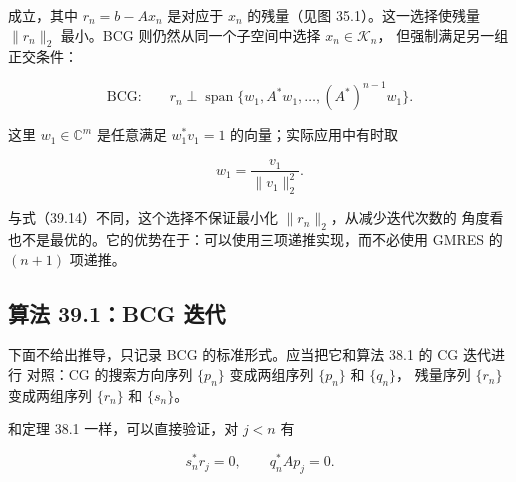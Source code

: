 \documentclass[UTF8,fontset=none,12pt]{ctexart}
\begin{document}
成立，其中 $r_n=b-Ax_n$ 是对应于 $x_n$ 的残量（见图 35.1）。这一选择使残量
$\lVert r_n\rVert_2$ 最小。BCG 则仍然从同一个子空间中选择 $x_n\in\mathcal K_n$，
但强制满足另一组正交条件：

\begin{equation}
\text{BCG:}\qquad
r_n\perp\operatorname{span}\{w_1,A^*w_1,\ldots,(A^*)^{n-1}w_1\}.
\tag{39.15}
\end{equation}

这里 $w_1\in\mathbb C^m$ 是任意满足 $w_1^*v_1=1$ 的向量；实际应用中有时取

\[
w_1=\frac{v_1}{\lVert v_1\rVert_2^2}.
\]

与式（39.14）不同，这个选择不保证最小化 $\lVert r_n\rVert_2$，从减少迭代次数的
角度看也不是最优的。它的优势在于：可以使用三项递推实现，而不必使用 GMRES 的
$(n+1)$ 项递推。

\subsection*{算法 39.1：BCG 迭代}

下面不给出推导，只记录 BCG 的标准形式。应当把它和算法 38.1 的 CG 迭代进行
对照：CG 的搜索方向序列 $\{p_n\}$ 变成两组序列 $\{p_n\}$ 和 $\{q_n\}$，
残量序列 $\{r_n\}$ 变成两组序列 $\{r_n\}$ 和 $\{s_n\}$。

\begin{center}
\end{center}

和定理 38.1 一样，可以直接验证，对 $j<n$ 有

\[
s_n^*r_j=0,
\qquad
q_n^*Ap_j=0.
\]
\end{document}

